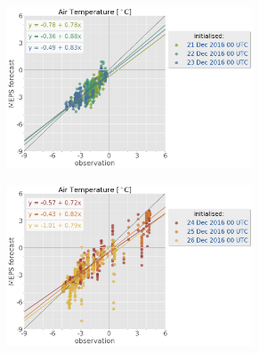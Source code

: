 \begin{figure}[h!]
     \begin{subfigure}[b]{0.49\textwidth}
     	\centering
     	\includegraphics[trim={25.cm 15.5cm 0cm 3.6cm},clip,
    width=0.8\textwidth]{./fig_sfc_temp/obs_model_20161221_23_00}
     \end{subfigure}
     \begin{subfigure}[b]{0.49\textwidth}
     	\centering
     	\includegraphics[trim={25.cm 15.5cm 0cm 3.6cm},clip,
    width=0.8\textwidth]{./fig_sfc_temp/obs_model_20161224_26_00}
     \end{subfigure}
\end{figure}
